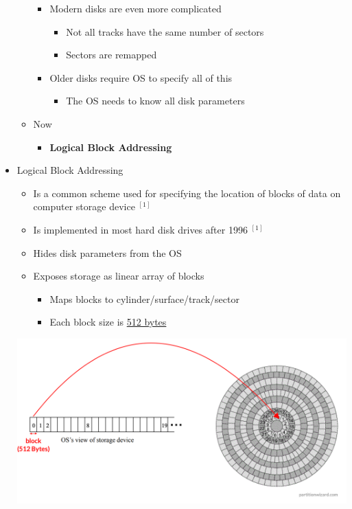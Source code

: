 \documentclass[12pt]{article}
\begin{document}
\begin{itemize}
\begin{itemize}
\begin{itemize}
            \item Modern disks are even more complicated
            \begin{itemize}
                \item Not all tracks have the same number of sectors
                \item Sectors are remapped
            \end{itemize}
            \item Older disks require OS to specify all of this
            \begin{itemize}
                \item The OS needs to know all disk parameters
            \end{itemize}
        \end{itemize}
        \item Now
        \begin{itemize}
            \item \textbf{Logical Block Addressing}
        \end{itemize}
    \end{itemize}

    \item Logical Block Addressing
    \begin{itemize}
        \item Is a common scheme used for specifying the location of blocks of data
        on computer storage device $^{[1]}$
        \item Is implemented in most hard disk drives after 1996 $^{[1]}$
        \item Hides disk parameters from the OS
        \item Exposes storage as linear array of blocks
        \begin{itemize}
            \item Maps blocks to cylinder/surface/track/sector
            \item Each block size is \underline{512 bytes}
        \end{itemize}
    \end{itemize}

    \begin{center}
        \includegraphics[width=0.8\linewidth]{images/week_9_notes_1_8.png}
    \end{center}


\end{itemize}
\end{document}
